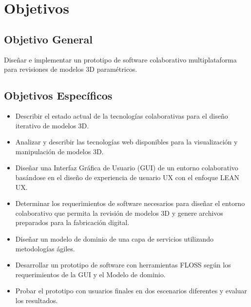 \clearpage
\section{Objetivos}
\subsection {Objetivo General}
Diseñar e implementar un prototipo de software colaborativo multiplataforma para revisiones de modelos 3D paramétricos.

\subsection {Objetivos Específicos}
\begin{itemize}
  \item Describir el estado actual de la tecnologías colaborativas para el diseño iterativo de modelos 3D.
  \item Analizar y describir las tecnologías web disponibles para la visualización y manipulación de modelos 3D.
  \item Diseñar una Interfaz Gráfica de Usuario (GUI) de un entorno colaborativo basándose en el diseño de experiencia de usuario UX con el enfoque LEAN UX.
  \item Determinar los requerimientos de software necesarios para diseñar el entorno colaborativo que permita la revisión de modelos 3D y genere archivos preparados para la fabricación digital.
  \item Diseñar un modelo de dominio de una capa de servicios utilizando metodologías ágiles.
  \item Desarrollar un prototipo de software con herramientas FLOSS según los requerimientos de la GUI y el Modelo de dominio.
  \item Probar el prototipo con usuarios finales en dos escenarios diferentes y evaluar los resultados.
\end{itemize}





